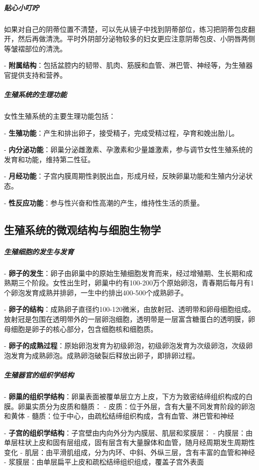 \begin{enumerate}
\subparagraph{贴心小叮咛}

如果对自己的阴蒂位置不清楚，可以先从镜子中找到阴蒂部位，练习把阴蒂包皮翻开，然后再做清洗。平时外阴部分泌物较多的妇女更应注意阴蒂包皮、小阴唇两侧等皱褶部位的清洗。

- \textbf{附属结构}：包括盆腔内的韧带、肌肉、筋膜和血管、淋巴管、神经等，为生殖器官提供支持和营养。

\subparagraph{生殖系统的生理功能}

女性生殖系统的主要生理功能包括：

- \textbf{生殖功能}：产生和排出卵子，接受精子，完成受精过程，孕育和娩出胎儿。

- \textbf{内分泌功能}：卵巢分泌雌激素、孕激素和少量雄激素，参与调节女性生殖系统的发育和功能，维持第二性征。

- \textbf{月经功能}：子宫内膜周期性剥脱出血，形成月经，反映卵巢功能和生殖内分泌状态。

- \textbf{性反应功能}：参与性兴奋和性高潮的产生，维持性生活的质量。

\subsection{生殖系统的微观结构与细胞生物学}

\subparagraph{生殖细胞的发生与发育}

- \textbf{卵子的发生}：卵子由卵巢中的原始生殖细胞发育而来，经过增殖期、生长期和成熟期三个阶段。女性出生时，卵巢中约有100-200万个原始卵泡，青春期后每月有1个卵泡发育成熟并排卵，一生中约排出400-500个成熟卵子。

- \textbf{卵子的结构}：成熟卵子直径约100-120微米，由放射冠、透明带和卵母细胞组成。放射冠是包围在透明带外的一层卵泡细胞，透明带是一层富含糖蛋白的透明膜，卵母细胞是卵子的核心部分，包含细胞核和细胞质。

- \textbf{卵子的成熟过程}：原始卵泡发育为初级卵泡，初级卵泡发育为次级卵泡，次级卵泡发育为成熟卵泡。成熟卵泡破裂后释放出卵子，即排卵过程。

\subparagraph{生殖器官的组织学结构}

- \textbf{卵巢的组织学结构}：卵巢表面被覆单层立方上皮，下方为致密结缔组织构成的白膜。卵巢实质分为皮质和髓质：
  - 皮质：位于外层，含有大量不同发育阶段的卵泡和黄体
  - 髓质：位于中心，由疏松结缔组织构成，含有血管、淋巴管和神经

- \textbf{子宫的组织学结构}：子宫壁由内向外分为内膜层、肌层和浆膜层：
  - 内膜层：由单层柱状上皮和固有层组成，固有层含有大量腺体和血管，随月经周期发生周期性变化
  - 肌层：由平滑肌组成，分为内环、中斜、外纵三层，含有丰富的血管和神经
  - 浆膜层：由单层扁平上皮和疏松结缔组织组成，覆盖子宫外表面


\end{enumerate}
